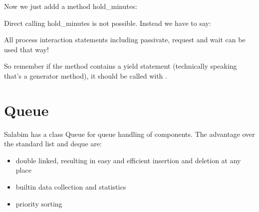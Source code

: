 \documentclass[letterpaper,10pt,english]{sphinxmanual}
\begin{document}
Now we just addd a method hold\_minutes:

\begin{sphinxVerbatim}[commandchars=\\\{\}]
  
       
\end{sphinxVerbatim}

Direct calling hold\_minutes is not possible. Instead we have to say:

\begin{sphinxVerbatim}[commandchars=\\\{\}]
 
     
           

    
         
         
\end{sphinxVerbatim}

All process interaction statements including passivate, request and wait can be used that way!

So remember if the method contains a yield statement (technically speaking that’s a generator method), it should be called with .


\chapter{Queue}
\label{\detokenize{Queue:queue}}\label{\detokenize{Queue::doc}}
Salabim has a class Queue for queue handling of components. The advantage over the standard list and deque are:
\begin{itemize}
\item {} 
double linked, resulting in easy and efficient insertion and deletion at any place

\item {} 
builtin data collection and statistics

\item {} 
priority sorting

\end{itemize}
\end{document}
